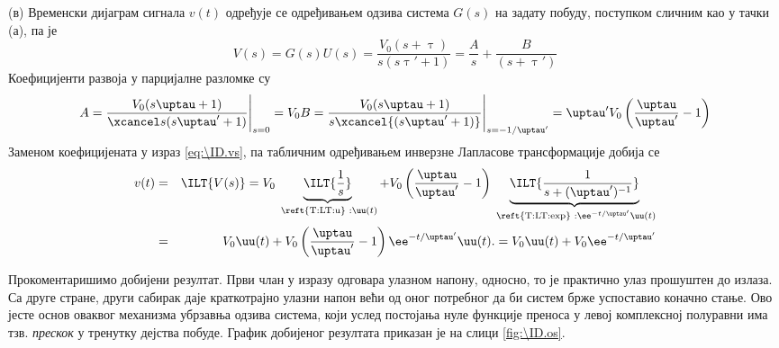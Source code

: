 (в) Временски дијаграм сигнала $v(t)$ одређује се одређивањем одзива система $G(s)$ на задату побуду, поступком 
сличним као у тачки (а), па је 
\begin{equation}
    V(s) = G(s) U(s) = \dfrac{V_0 (s + \uptau)}{s (s\uptau' + 1) } = 
    \dfrac{A}{s} + \dfrac{B}{(s + \uptau')} \label{eq:\ID.vs}
\end{equation}
Коефицијенти развоја у парцијалне разломке су 
\begin{equation}
    A =  \dfrac{V_0 {(s\uptau + 1)}}{\xcancel s (s\uptau' + 1) } \Bigg|_{s = 0} = V_0 \\
    B =  \dfrac{V_0 {(s\uptau + 1)}}{ s \xcancel{(s\uptau' + 1)} } \Bigg|_{s = -1/\uptau'}
    = \uptau' V_0 \left(\dfrac{\uptau}{\uptau'} - 1\right)
\end{equation} 
Заменом коефицијената у израз \eqref{eq:\ID.vs}, па табличним одређивањем инверзне Лапласове трансформације добија се 
\begin{eqnarray}
    v(t) &=& \ILT{V(s)} 
    = V_0 \underbrace{\ILT{ \dfrac{1}{s} }}_{\text{ \reft{T:LT:u} } : \uu(t)}  + V_0\left( 
        \dfrac{\uptau}{\uptau'} - 1
     \right)
     \underbrace{\ILT{
        \dfrac{1}{s + (\uptau')^{-1} }
     }}_{\text{ \reft{T:LT:exp} } : \ee^{-t/\uptau'} \uu(t)} 
     \\
     &=& 
    V_0 \uu(t) +  V_0\left( 
        \dfrac{\uptau}{\uptau'} - 1
     \right) \ee^{-t/\uptau'}
     \uu(t).
     = 
     V_0\uu(t) 
     + 
     V_0 \ee^{-t/\uptau'}
\end{eqnarray}

Прокоментаришимо добијени резултат. Први члан у изразу одговара улазном напону, односно, то је практично 
улаз прошуштен до излаза. Са друге стране, други сабирак даје краткотрајно улазни напон већи од оног 
потребног да би систем брже успоставио коначно стање. Ово јесте основ оваквог механизма убрзавња одзива
система, који услед 
постојања нуле функције преноса у левој комплексној полуравни има тзв. \textit{прескок} у тренутку дејства побуде. 
График добијеног резултата приказан је на слици \ref{fig:\ID.os}. 

